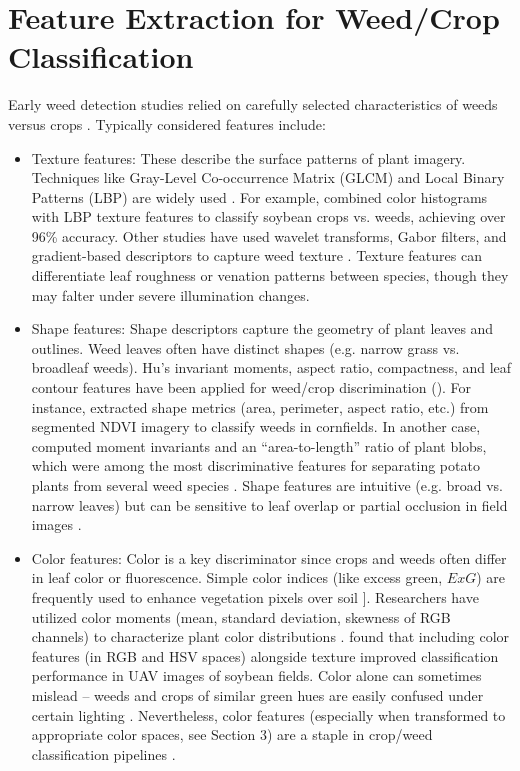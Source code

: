 \documentclass[letterpaper]{report}
\begin{document}
\section{Feature Extraction for Weed/Crop Classification}  
Early weed detection studies relied on carefully selected  characteristics of weeds versus crops \parencite{Wu2021-gt}. Typically considered features include:  

\begin{itemize}
	\item{Texture features: These describe the surface patterns of plant imagery. Techniques like Gray-Level Co-occurrence Matrix (\gls{GLCM}) and Local Binary Patterns (\gls{LBP}) are widely used \parencite{Mekhalfa2021-np}. For example, \citeauthor{Mekhalfa2021-np} combined color histograms with LBP texture features to classify soybean crops vs. weeds, achieving over 96\% accuracy. Other studies have used wavelet transforms, Gabor filters, and gradient-based descriptors to capture weed texture \parencite{Wu2021-gt}. Texture features can differentiate leaf roughness or venation patterns between species, though they may falter under severe illumination changes.}  

	\item{Shape features: Shape descriptors capture the geometry of plant leaves and outlines. Weed leaves often have distinct shapes (e.g. narrow grass vs. broadleaf weeds). Hu’s invariant moments, aspect ratio, compactness, and leaf contour features have been applied for weed/crop discrimination \parencite{Ahsen2024-tr} (\cite{Bazrafkan2024-bl}). For instance, \citeauthor{Bazrafkan2024-bl} extracted shape metrics (area, perimeter, aspect ratio, etc.) from segmented \gls{NDVI} imagery to classify weeds in cornfields. In another case, \citeauthor{Sabzi2020-af} computed moment invariants and an “area-to-length” ratio of plant blobs, which were among the most discriminative features for separating potato plants from several weed species \parencite{Sabzi2020-af}. Shape features are intuitive (e.g. broad vs. narrow leaves) but can be sensitive to leaf overlap or partial occlusion in field images \parencite{Sabzi2020-af}. }

	\item{Color features: Color is a key discriminator since crops and weeds often differ in leaf color or fluorescence. Simple color indices (like excess green, $ExG$) are frequently used to enhance vegetation pixels over soil ]. Researchers have utilized color moments (mean, standard deviation, skewness of RGB channels) to characterize plant color distributions \parencite{Wu2021-gt}.  \citeauthor{Mekhalfa2021-np} found that including color features (in RGB and HSV spaces) alongside texture improved classification performance in UAV images of soybean fields. Color alone can sometimes mislead – weeds and crops of similar green hues are easily confused under certain lighting \parencite{Wu2021-gt}. Nevertheless, color features (especially when transformed to appropriate color spaces, see Section 3) are a staple in crop/weed classification pipelines \parencite{Sabzi2020-af}.  }


\end{itemize}
\end{document}
